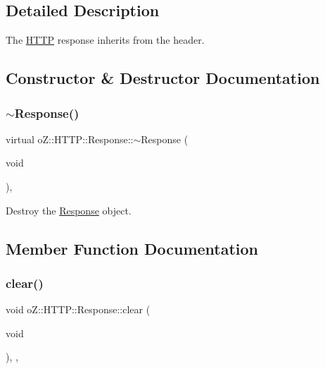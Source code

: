\subsection{Detailed Description}
The \mbox{\hyperlink{namespaceo_z_1_1_h_t_t_p}{H\+T\+TP}} response inherits from the header. 

\subsection{Constructor \& Destructor Documentation}
\mbox{\label{classo_z_1_1_h_t_t_p_1_1_response_a0dd4953fa89d6f7c8fbe6fdc6a9ca50e}} 
\subsubsection{\texorpdfstring{$\sim$Response()}{~Response()}}
{\footnotesize\ttfamily virtual o\+Z\+::\+H\+T\+T\+P\+::\+Response\+::$\sim$\+Response (\begin{DoxyParamCaption}\item[{void}]{ }\end{DoxyParamCaption})\hspace{0.3cm}{\ttfamily [virtual]}, {\ttfamily [default]}}



Destroy the \mbox{\hyperlink{classo_z_1_1_h_t_t_p_1_1_response}{Response}} object. 



\subsection{Member Function Documentation}
\mbox{\label{classo_z_1_1_h_t_t_p_1_1_response_a2bce180e3288f0bd78a9fbc2a74b608c}} 
\subsubsection{\texorpdfstring{clear()}{clear()}}
{\footnotesize\ttfamily void o\+Z\+::\+H\+T\+T\+P\+::\+Response\+::clear (\begin{DoxyParamCaption}\item[{void}]{ }\end{DoxyParamCaption})\hspace{0.3cm}{\ttfamily [inline]}, {\ttfamily [override]}, {\ttfamily [virtual]}}



